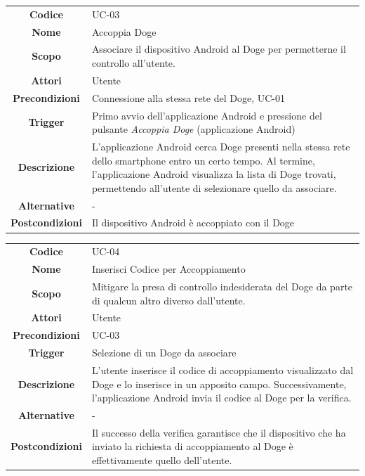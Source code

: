 \documentclass{article}
\begin{document}
\begin{adjustbox}{center}
\begin{tabular}{|c|p{10cm}|}
\hline
\textbf{Codice} & UC-03 \\
\textbf{Nome} & Accoppia Doge \\
\textbf{Scopo} & Associare il dispositivo Android al Doge per permetterne il controllo all'utente. \\
\textbf{Attori} & Utente \\
\textbf{Precondizioni} & Connessione alla stessa rete del Doge, UC-01 \\
\textbf{Trigger} & Primo avvio dell'applicazione Android e pressione del pulsante \emph{Accoppia Doge} (applicazione Android) \\
\textbf{Descrizione} & L'applicazione Android cerca Doge presenti nella stessa rete dello smartphone entro un certo tempo. Al termine, l'applicazione Android
visualizza la lista di Doge trovati, permettendo all'utente di
selezionare quello da associare. \\
\textbf{Alternative} & - \\
\textbf{Postcondizioni} & Il dispositivo Android è accoppiato con il Doge \\
\hline
\end{tabular}
\end{adjustbox}

\begin{adjustbox}{center}
\begin{tabular}{|c|p{10cm}|}
\hline
\textbf{Codice} & UC-04 \\
\textbf{Nome} & Inserisci Codice per Accoppiamento \\
\textbf{Scopo} & Mitigare la presa di controllo indesiderata del Doge da parte di qualcun altro diverso dall'utente. \\
\textbf{Attori} & Utente \\
\textbf{Precondizioni} & UC-03 \\
\textbf{Trigger} & Selezione di un Doge da associare \\
\textbf{Descrizione} & L'utente inserisce il codice di accoppiamento visualizzato dal Doge e lo inserisce in un apposito campo. Successivamente, l'applicazione
Android invia il codice al Doge per la verifica. \\
\textbf{Alternative} & - \\
\textbf{Postcondizioni} & Il successo della verifica garantisce che il dispositivo che ha inviato la richiesta di accoppiamento al Doge è effettivamente quello
dell'utente. \\
\hline
\end{tabular}
\end{adjustbox}
\end{document}
